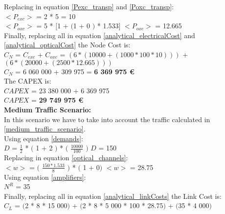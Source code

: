 Replacing in equation \ref{Pexc_transp} and \ref{Poxc_transp}:\\

$<P_{exc}>$ = 2 * 5 = 10\\

$<P_{oxc}>$ = 5 * $[$1 + $($1 + $0$ $)$ * 1.533$]$ \qquad \quad $<P_{oxc}>$ = 12.665 \\

Finally, replacing all in equation \ref{analytical_electricalCost} and \ref{analytical_opticalCost} the Node Cost is:\\

$C_N$ = $C_{exc}$ + $C_{oxc}$ = $\left( 6*(10 000 + (1 000 * 100 * 10 ) ) \right)$ + $\left(6*(20 000 + (2 500 * 12.665 ) ) \right)$\\

$C_N$ = 6 060 000 + 309 975 = \textbf{6 369 975 \euro}\\

The CAPEX is:\\
$CAPEX$ = 23 380 000 + 6 369 975\\

$CAPEX$ = \textbf{29 749 975 \euro}\\


\textbf{Medium Traffic Scenario:}\\
In this scenario we have to take into account the traffic calculated in \ref{medium_traffic_scenario}.\\

Using equation \ref{demands}:\\

$D$ = $\frac{1}{2}$ * $($ 1 + 2 $)$ * $($ $\frac{10000}{100}$ $)$ \qquad \qquad $D$ = 150\\

Replacing in equation \ref{optical_channels}:\\

$<w>$ = $($ $\frac{150 * 1.533}{8}$ $)$ * $($ 1 + 0$)$ \qquad \qquad $<w>$ = 28.75\\

Using equation \ref{amplifiers}:\\

$N^R$ = 35\\

Finally, replacing all in equation \ref{analytical_linkCosts} the Link Cost is:\\

$C_L$ = $($2 * 8 * 15 000$)$ + $($2 * 8 * 5 000 * 100 * 28.75$)$ + $($35 * 4 000$)$\\

